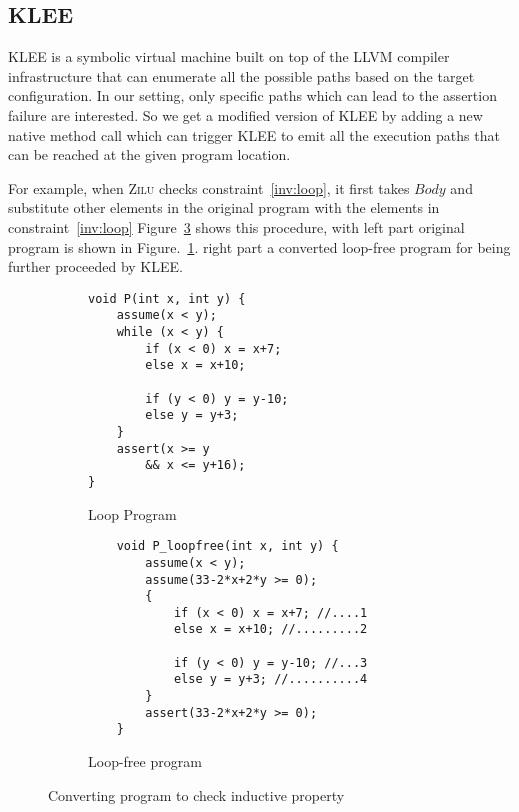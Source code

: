 



\subsection{KLEE}
\label{subsec:klee}
KLEE is a symbolic virtual machine built on top of the LLVM compiler infrastructure
that can enumerate all the possible paths based on the target configuration.
In our setting, only specific paths which can lead to the assertion failure are interested.
So we get a modified version of KLEE by adding a new native method call
which can trigger KLEE to emit all the execution paths that can be reached at the given program location.


For example, when \textsc{Zilu} checks constraint~\ref{inv:loop}, 
it first takes $Body$ and substitute other elements in the original program with the elements in constraint~\ref{inv:loop}
Figure~\ref{fig:klee:program} shows this procedure,
with left part original program is shown in Figure.~\ref{fig:klee:program:in}.
right part a converted loop-free program for being further proceeded by KLEE.

\begin{figure}[!h]
\begin{subfigure}{0.19\textwidth}
    \centering
    {\scriptsize\begin{verbatim}
void P(int x, int y) {
    assume(x < y);
    while (x < y) {
        if (x < 0) x = x+7;
        else x = x+10;
    
        if (y < 0) y = y-10;
        else y = y+3; 
    }
    assert(x >= y
        && x <= y+16);
}
    \end{verbatim}}
    \vspace{-5mm}
    \caption{Loop Program}
    \label{fig:klee:program:in}
\end{subfigure}%
\begin{subfigure}{.19\textwidth}
      \centering
      \vspace{-0.1cm}
        {\scriptsize\begin{verbatim}
    void P_loopfree(int x, int y) {
        assume(x < y);
        assume(33-2*x+2*y >= 0);
        {
            if (x < 0) x = x+7; //....1
            else x = x+10; //.........2
    
            if (y < 0) y = y-10; //...3
            else y = y+3; //..........4
        }
        assert(33-2*x+2*y >= 0);
    }
    \end{verbatim}}
    \vspace{-5mm}
    \caption{Loop-free program}
      \label{fig:klee:program:out}
\end{subfigure}
\caption{Converting program to check inductive property}
\label{fig:klee:program}
\end{figure}

